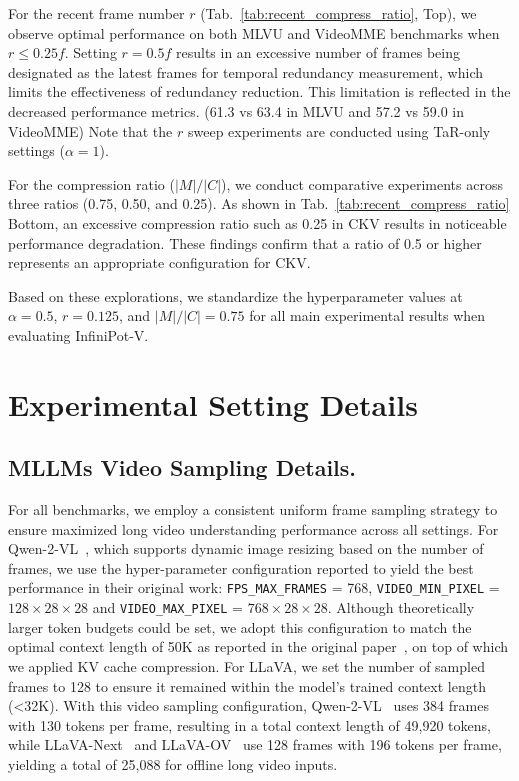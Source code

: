 For the recent frame number $r$ (Tab.~\ref{tab:recent_compress_ratio}, Top), we observe optimal performance on both MLVU and VideoMME benchmarks when $r \leq 0.25f$. Setting $r=0.5f$ results in an excessive number of frames being designated as the latest frames for temporal redundancy measurement, which limits the effectiveness of redundancy reduction. This limitation is reflected in the decreased performance metrics. (61.3 vs 63.4 in MLVU and 57.2 vs 59.0 in VideoMME) Note that the $r$ sweep experiments are conducted using TaR-only settings ($\alpha=1$).

For the compression ratio ($|M|/|C|$), we conduct comparative experiments across three ratios (0.75, 0.50, and 0.25). As shown in Tab.~\ref{tab:recent_compress_ratio} Bottom, an excessive compression ratio such as 0.25 in CKV results in noticeable performance degradation. These findings confirm that a ratio of 0.5 or higher represents an appropriate configuration for CKV.

Based on these explorations, we standardize the hyperparameter values at $\alpha=0.5$, $r=0.125$, and $|M|/|C|=0.75$ for all main experimental results when evaluating InfiniPot-V.


\section{Experimental Setting Details}\label{appn:exp}

\subsection{MLLMs Video Sampling Details.} For all benchmarks, we employ a consistent uniform frame sampling strategy to ensure maximized long video understanding performance across all settings. For Qwen-2-VL~\cite{Qwen2VL}, which supports dynamic image resizing based on the number of frames, we use the hyper-parameter configuration reported to yield the best performance in their original work: \texttt{FPS\_MAX\_FRAMES} = 768, \texttt{VIDEO\_MIN\_PIXEL} = ${128 \times 28 \times 28}$ and \texttt{VIDEO\_MAX\_PIXEL} = ${768 \times 28 \times 28}$. Although theoretically larger token budgets could be set, we adopt this configuration to match the optimal context length of 50K as reported in the original paper~\cite{Qwen2VL}, on top of which we applied KV cache compression. For LLaVA, we set the number of sampled frames to 128 to ensure it remained within the model’s trained context length (<32K). With this video sampling configuration, Qwen-2-VL~\cite{Qwen2VL} uses 384 frames with 130 tokens per frame, resulting in a total context length of 49,920 tokens, while LLaVA-Next~\cite{zhang2024llavanext-video} and LLaVA-OV~\cite{li2024llava} use 128 frames with 196 tokens per frame, yielding a total of 25,088 for offline long video inputs.

